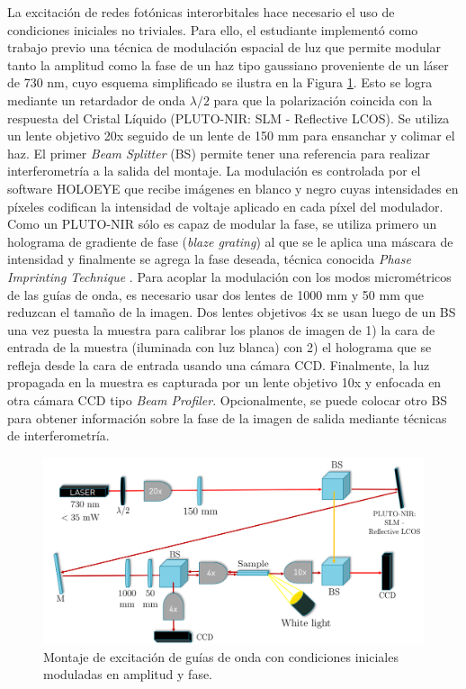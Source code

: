 \documentclass{article}
\begin{document}
La excitación de redes fotónicas interorbitales hace necesario el uso de condiciones iniciales no triviales. Para ello, el estudiante implementó como trabajo previo una técnica de modulación espacial de luz que permite modular tanto la amplitud como la fase de un haz tipo gaussiano proveniente de un láser de 730 nm, cuyo esquema simplificado se ilustra en la Figura \ref{fig:SLM}. Esto se logra mediante un retardador de onda $\lambda/2$ para que la polarización coincida con la respuesta del Cristal Líquido (PLUTO-NIR: SLM - Reflective LCOS). Se utiliza un lente objetivo 20x seguido de un lente de 150 mm para ensanchar y colimar el haz. El primer \textit{Beam Splitter} (BS) permite tener una referencia para realizar interferometría a la salida del montaje. La modulación es controlada por el software HOLOEYE que recibe imágenes en blanco y negro cuyas intensidades en píxeles codifican la intensidad de voltaje aplicado en cada píxel del modulador. Como un PLUTO-NIR sólo es capaz de modular la fase, se utiliza primero un holograma de gradiente de fase (\textit{blaze grating}) al que se le aplica una máscara de intensidad y finalmente se agrega la fase deseada, técnica conocida \textit{Phase Imprinting Technique} \cite{slm}. Para acoplar la modulación con los modos micrométricos de las guías de onda, es necesario usar dos lentes de 1000 mm y 50 mm que reduzcan el tamaño de la imagen. Dos lentes objetivos 4x se usan luego de un BS una vez puesta la muestra para calibrar los planos de imagen de 1) la cara de entrada de la muestra (iluminada con luz blanca) con 2) el holograma que se refleja desde la cara de entrada usando una cámara CCD. Finalmente, la luz propagada en la muestra es capturada por un lente objetivo 10x y enfocada en otra cámara CCD tipo \textit{Beam Profiler}. Opcionalmente, se puede colocar otro BS para obtener información sobre la fase de la imagen de salida mediante técnicas de interferometría.

\begin{figure}[H]
	\centering
	\includegraphics[width=0.7\linewidth]{./media/SLMsetup.png}
	\caption{Montaje de excitación de guías de onda con condiciones iniciales moduladas en amplitud y fase.\label{fig:SLM}}
\end{figure}
\end{document}
